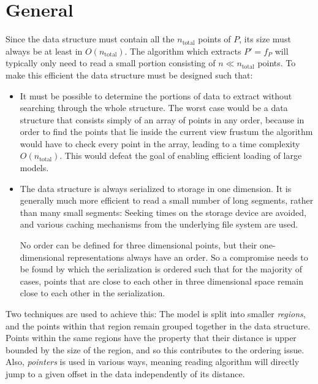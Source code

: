 \documentclass[a4paper,10pt,abstracton,notitlepage]{scrreprt}
\begin{document}
\section{General}
Since the data structure must contain all the $n_{\text{total}}$ points of $P$, its size must always be at least in $O(n_{\text{total}})$. The algorithm which extracts $P' = f_{P}$ will typically only need to read a small portion consisting of $n \ll n_{\text{total}}$ points. To make this efficient the data structure must be designed such that:
\begin{itemize}
\item It must be possible to determine the portions of data to extract without searching through the whole structure. The worst case would be a data structure that consists simply of an array of points in any order, because in order to find the points that lie inside the current view frustum the algorithm would have to check every point in the array, leading to a time complexity $O(n_{\text{total}})$. This would defeat the goal of enabling efficient loading of large models.
\item The data structure is always serialized to storage in one dimension. It is generally much more efficient to read a small number of long segments, rather than many small segments: Seeking times on the storage device are avoided, and various caching mechanisms from the underlying file system are used.

No order can be defined for three dimensional points, but their one-dimensional representations always have an order. So a compromise needs to be found by which the serialization is ordered such that for the majority of cases, points that are close to each other in three dimensional space remain close to each other in the serialization.
\end{itemize}

Two techniques are used to achieve this: The model is split into smaller \emph{regions}, and the points within that region remain grouped together in the data structure. Points within the same regions have the property that their distance is upper bounded by the size of the region, and so this contributes to the ordering issue. Also, \emph{pointers} is used in various ways, meaning reading algorithm will directly jump to a given offset in the data independently of its distance.
\end{document}
